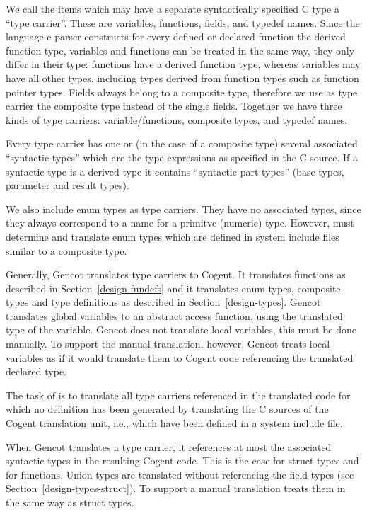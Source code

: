 We call the items which may have a separate syntactically
specified C type a ``type carrier''. These are variables, functions, fields, and typedef names. Since the language-c
parser constructs for every defined or declared function the derived function type, variables and functions
can be treated in the same way, they only differ in their type: functions have a derived function type, whereas
variables may have all other types, including types derived from function types such as function pointer types. Fields 
always belong to a composite type, therefore we use as type carrier the composite type instead of the single fields.
Together we have three kinds of type carriers: variable/functions, composite types, and typedef names.

Every type carrier has one or (in the case of a composite type) several associated ``syntactic types''
which are the type expressions as specified in the C source. If a syntactic type is a derived type it contains
``syntactic part types'' (base types, parameter and result types). 

We also include enum types as type carriers. They have no associated types, since they always correspond to a name 
for a primitve (numeric) type. However,  must determine and translate enum types which 
are defined in system include files similar to a composite type.

Generally, Gencot translates type carriers to Cogent. It translates functions as described in Section~\ref{design-fundefs}
and it translates enum types, composite types and type definitions as described in Section~\ref{design-types}.
Gencot translates global variables to an abstract access function, using the translated type of the variable.
Gencot does not translate local variables, this must be done manually. To support the manual translation, 
however, Gencot treats local variables as if it would translate them to Cogent code referencing the translated 
declared type.

The task of  is to translate all type carriers referenced in the translated code for which
no definition has been generated by translating the C sources of the Cogent translation unit, i.e., which have
been defined in a system include file.

When Gencot translates a type carrier, it references at most the associated syntactic types in the resulting Cogent code.
This is the case for struct types and for functions. Union types are translated without referencing the field types
(see Section~\ref{design-types-struct}). To support a manual translation  treats them in 
the same way as struct types.

